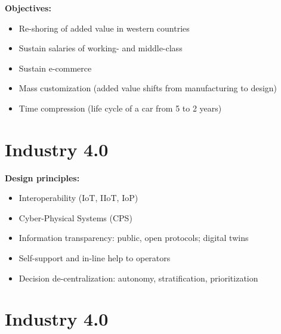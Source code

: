 \documentclass[
  letterpaper,
  DIV=11,
  numbers=noendperiod]{scrartcl}
\providecommand{\tightlist}{%
  \setlength{\itemsep}{0pt}\setlength{\parskip}{0pt}}
\begin{document}
\textbf{Objectives:}

\begin{itemize}
\tightlist
\item
  Re-shoring of added value in western countries
\item
  Sustain salaries of working- and middle-class
\item
  Sustain e-commerce
\item
  Mass customization (added value shifts from manufacturing to design)
\item
  Time compression (life cycle of a car from 5 to 2 years)
\end{itemize}

\section{Industry 4.0}\label{industry-4.0-2}

\textbf{Design principles:}

\begin{itemize}
\tightlist
\item
  Interoperability (IoT, IIoT, IoP)
\item
  Cyber-Physical Systems (CPS)
\item
  Information transparency: public, open protocols; digital twins
\item
  Self-support and in-line help to operators
\item
  Decision de-centralization: autonomy, stratification, prioritization
\end{itemize}

\section{Industry 4.0}\label{industry-4.0-3}
\end{document}
